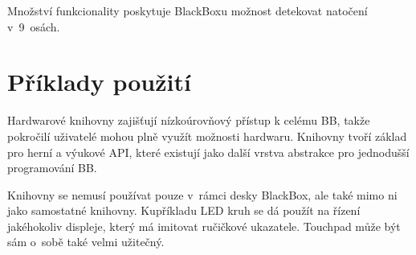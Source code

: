 Množství funkcionality poskytuje BlackBoxu možnost detekovat natočení v~9~osách. %

\section{Příklady použití}

Hardwarové knihovny zajišťují nízkoúrovňový přístup k celému BB, takže pokročilí uživatelé mohou plně využít možnosti hardwaru.
Knihovny tvoří základ pro herní a výukové API, které existují jako další vrstva abstrakce pro jednodušší programování BB.

Knihovny se nemusí používat pouze v~rámci desky BlackBox, ale také mimo ni jako samostatné knihovny.
Kupříkladu LED kruh se dá použít na řízení jakéhokoliv displeje, který má imitovat ručičkové ukazatele.
Touchpad může být sám o~sobě také velmi užitečný.
